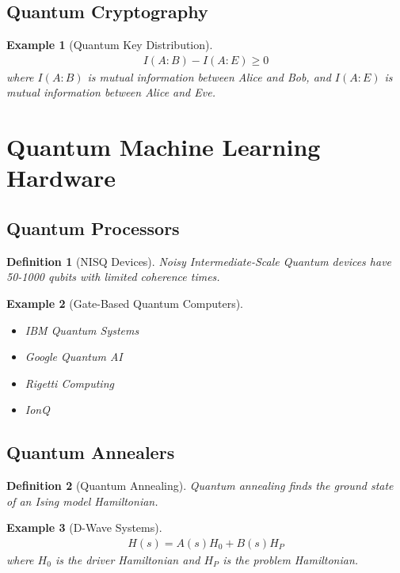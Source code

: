 \documentclass[11pt]{article}
\newtheorem{definition}{Definition}[section]
\newtheorem{example}{Example}[section]
\begin{document}
\subsection{Quantum Cryptography}

\begin{example}[Quantum Key Distribution]
\begin{align}
I(A:B) - I(A:E) \geq 0
\end{align}
where $I(A:B)$ is mutual information between Alice and Bob, and $I(A:E)$ is mutual information between Alice and Eve.
\end{example}

\section{Quantum Machine Learning Hardware}

\subsection{Quantum Processors}

\begin{definition}[NISQ Devices]
Noisy Intermediate-Scale Quantum devices have 50-1000 qubits with limited coherence times.
\end{definition}

\begin{example}[Gate-Based Quantum Computers]
\begin{itemize}
    \item IBM Quantum Systems
    \item Google Quantum AI
    \item Rigetti Computing
    \item IonQ
\end{itemize}
\end{example}

\subsection{Quantum Annealers}

\begin{definition}[Quantum Annealing]
Quantum annealing finds the ground state of an Ising model Hamiltonian.
\end{definition}

\begin{example}[D-Wave Systems]
\begin{align}
H(s) = A(s) H_0 + B(s) H_P
\end{align}
where $H_0$ is the driver Hamiltonian and $H_P$ is the problem Hamiltonian.
\end{example}
\end{document}
